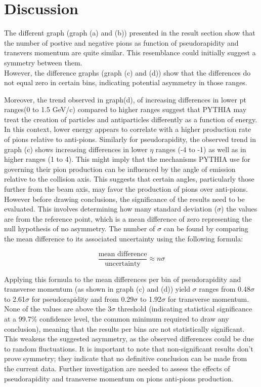 \section*{Discussion}
The different graph (graph (a) and (b)) presented in the result section show that the number of postive and negative pions as function of pseudorapidity and transvers momentum are quite similar. This resemblance could initially suggest a symmetry between them. 
\\

However, the difference graphs (graph (c) and (d)) show that the differences do not equal zero in certain bins, indicating potential asymmetry in those ranges. 

Moreover, the trend observed in graph(d), of increasing differences in lower pt ranges(0 to 1.5 GeV/c) compared to higher ranges suggest that PYTHIA may treat the creation of particles and antiparticles differently as a function of energy. In this context, lower energy appears to correlate with a higher production rate of pions relative to anti-pions. Similarly for pseudorapidity, the observed trend in graph (c) shows increasing differences in lower $\eta$ ranges (-4 to -1) as well as in higher ranges (1 to 4). This might imply that the mechanisms PYTHIA use for governing their pion production can be influenced by the angle of emission relative to the collision axis. This suggests that certain angles, particularly those further from the beam axis, may favor the production of pions over anti-pions.
\\

However before drawing conclusions, the significance of the results need to be evaluated. This involves determining how many standard deviation ($\sigma$) the values are from the reference point, which is a mean difference of zero representing the null hypothesis of no asymmetry. The number of $\sigma$ can be found by comparing the mean difference to its associated uncertainty using the following formula:

\[\frac{\text{mean difference}}{\text{uncertainty}}\approx n \sigma\]

Applying this formula to the mean differences per bin of pseudorapidity and transverse momentum (as shown in graph (c) and (d)) yield $\sigma$ ranges from 0.48$\sigma$ to  2.61$\sigma$ for pseudorapidity and from 0.29$\sigma$ to  1.92$\sigma$ for transverse momentum. None of the values are above the 3$\sigma$ threshold (indicating statistical significance at a 99.7\% confidence level, the common minimum required to draw any conclusion), meaning that the results per bins are not statistically significant. This weakens the suggested asymmetry, as the observed differences could be due to random fluctuations. It is important to note that non-significant results don't prove symmetry; they indicate that no definitive conclusion can be made from the current data. Further investigation are needed to assess the effects of pseudorapidity and transverse momentum on pions anti-pions production.    
\\

